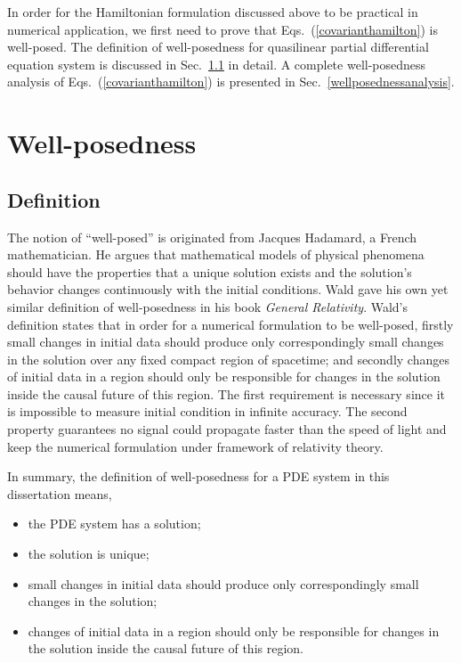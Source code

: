 In order for the Hamiltonian formulation discussed above to be practical in numerical application, we first need to prove that Eqs.~(\ref{covarianthamilton}) is well-posed. The definition of well-posedness for quasilinear partial differential equation system is discussed in Sec.~\ref{wellposednessdefinition} in detail. A complete well-posedness analysis of Eqs.~(\ref{covarianthamilton}) is presented in Sec.~\ref{wellposednessanalysis}.
\section{Well-posedness}\label{wellposedness}
\subsection{Definition}\label{wellposednessdefinition}
The notion of ``well-posed'' is originated from Jacques Hadamard\cite[pp. 49--52]{hadamard}, a French mathematician. He argues that mathematical models of physical phenomena should have the properties that a unique solution exists and the solution's behavior changes continuously with the initial conditions. Wald gave his own yet similar definition of well-posedness in his book {\em General Relativity}\cite[pp. 244]{Wald:GRbook}. Wald's definition states that in order for a numerical formulation to be well-posed, firstly small changes in initial data should produce only correspondingly small changes in the solution over any fixed compact region of spacetime; and secondly changes of initial data in a region should only be responsible for changes in the solution inside the causal future of this region. The first requirement is necessary since it is impossible to measure initial condition in infinite accuracy. The second property guarantees no signal could propagate faster than the speed of light and keep the numerical formulation under framework of relativity theory. 

In summary, the definition of well-posedness for a PDE system in this dissertation means, 
\begin{itemize}
	\item{the PDE system has a solution;}
	\item{the solution is unique;}
	\item{small changes in initial data should produce only correspondingly small changes in the solution;}
	\item{changes of initial data in a region should only be responsible for changes in the solution inside the causal future of this region. }	
\end{itemize}

